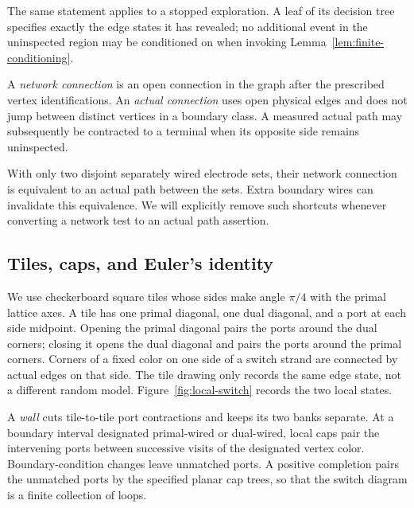 The same statement applies to a stopped exploration. A leaf of its
decision tree specifies exactly the edge states it has revealed;
no additional event in the uninspected region may be conditioned on
when invoking Lemma~\ref{lem:finite-conditioning}.

\begin{definition}
\label{def:actual-network}
A \emph{network connection} is an open connection in the graph after
the prescribed vertex identifications. An \emph{actual connection}
uses open physical edges and does not jump between distinct vertices
in a boundary class. A measured actual path may subsequently be
contracted to a terminal when its opposite side remains uninspected.
\end{definition}

With only two disjoint separately wired electrode sets, their network
connection is equivalent to an actual path between the sets. Extra
boundary wires can invalidate this equivalence. We will explicitly
remove such shortcuts whenever converting a network test to an actual
path assertion.

\subsection{Tiles, caps, and Euler's identity}

We use checkerboard square tiles whose sides make angle $\pi/4$ with
the primal lattice axes. A tile has one primal diagonal, one dual
diagonal, and a port at each side midpoint. Opening the primal diagonal
pairs the ports around the dual corners; closing it opens the dual
diagonal and pairs the ports around the primal corners. Corners of a
fixed color on one side of a switch strand are connected by actual
edges on that side. The tile drawing only records the same edge state,
not a different random model. Figure~\ref{fig:local-switch} records
the two local states.



A \emph{wall} cuts tile-to-tile port contractions and keeps its two
banks separate. At a boundary interval designated primal-wired or
dual-wired, local caps pair the intervening ports between successive
visits of the designated vertex color. Boundary-condition changes
leave unmatched ports. A positive
completion pairs the unmatched ports by the specified planar cap
trees, so that the switch diagram is a finite collection of loops.

